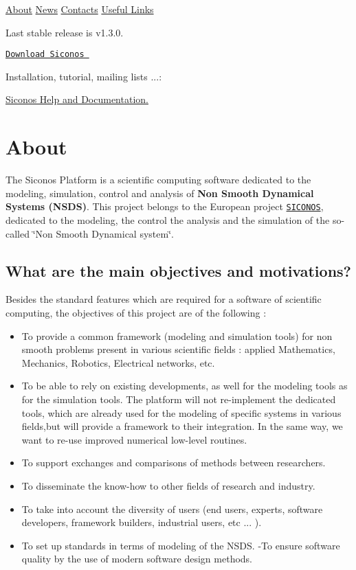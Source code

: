   \hyperlink{index_about}{About} \hyperlink{index_news}{News} \hyperlink{index_contacts}{Contacts} \hyperlink{index_links}{Useful Links}\par
   Last stable release is v1.3.0. \par
 \href{https://gforge.inria.fr/frs/?group_id=9}{\tt Download Siconos } \par
 Installation, tutorial, mailing lists ...: \par
 \hyperlink{SiconosDocList}{Siconos Help and Documentation.}\par
      \hypertarget{index_about}{}\section{About}\label{index_about}
The Siconos Platform is a scientific computing software dedicated to the modeling, simulation, control and analysis of {\bf Non Smooth Dynamical Systems (NSDS)}. This project belongs to the European project \href{http://siconos.inrialpes.fr/}{\tt SICONOS}, dedicated to the modeling, the control the analysis and the simulation of the so-called \char`\"{}Non Smooth Dynamical system\char`\"{}.\par
 \hypertarget{index_MainObj}{}\subsection{What are the main objectives and motivations?}\label{index_MainObj}
Besides the standard features which are required for a software of scientific computing, the objectives of this project are of the following :\begin{itemize}
\item To provide a common framework (modeling and simulation tools) for non smooth problems present in various scientific fields : applied Mathematics, Mechanics, Robotics, Electrical networks, etc.\item To be able to rely on existing developments, as well for the modeling tools as for the simulation tools. The platform will not re-implement the dedicated tools, which are already used for the modeling of specific systems in various fields,but will provide a framework to their integration. In the same way, we want to re-use improved numerical low-level routines.\item To support exchanges and comparisons of methods between researchers.\item To disseminate the know-how to other fields of research and industry.\item To take into account the diversity of users (end users, experts, software developers, framework builders, industrial users, etc ... ).\item To set up standards in terms of modeling of the NSDS. -To ensure software quality by the use of modern software design methods. \end{itemize}

